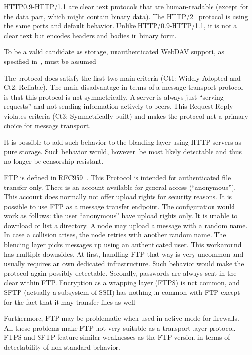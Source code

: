 HTTP0.9-HTTP/1.1 are clear text protocols that are human-readable (except for the data part, which might contain binary data). The HTTP/2~\cite{rfc7540} protocol is using the same ports and default behavior. Unlike HTTP/0.9-HTTP/1.1, it is not a clear text but encodes headers and bodies in binary form. 

To be a valid candidate as storage, unauthenticated WebDAV support, as specified in~\cite{rfc4918}, must be assumed.

The protocol does satisfy the first two main criteria (Ct1: Widely Adopted and Ct2: Reliable). The main disadvantage in terms of a message transport protocol is that this protocol is not symmetrically. A server is always just ``serving requests'' and not sending information actively to peers. This Request-Reply violates criteria (Ct3: Symmetrically built) and makes the protocol not a primary choice for message transport. 

It is possible to add such behavior to the blending layer using HTTP servers as pure storage. Such behavior would, however, be most likely detectable and thus no longer be censorship-resistant.

FTP is defined in RFC959~\cite{rfc959}. This Protocol is intended for authenticated file transfer only. There is an account available for general access (``anonymous''). This account does normally not offer upload rights for security reasons. It is possible to use FTP as a message transfer endpoint. The configuration would work as follows: the user ``anonymous'' have upload rights only. It is unable to download or list a directory. A node may upload a message with a random name. In case a collision arises, the node retries with another random name. The blending layer picks messages up using an authenticated user. This workaround has multiple downsides. At first, handling FTP that way is very uncommon and usually requires an own dedicated infrastructure. Such behavior would make the protocol again possibly detectable. Secondly, passwords are always sent in the clear within FTP. Encryption as a wrapping layer (FTPS) is not common, and SFTP (actually a subsystem of SSH) has nothing in common with FTP except for the fact that it may transfer files as well.

Furthermore, FTP may be problematic when used in active mode for firewalls. All these problems make FTP not very suitable as a transport layer protocol. FTPS and SFTP feature similar weaknesses as the FTP version in terms of detectability of non-standard behavior.

